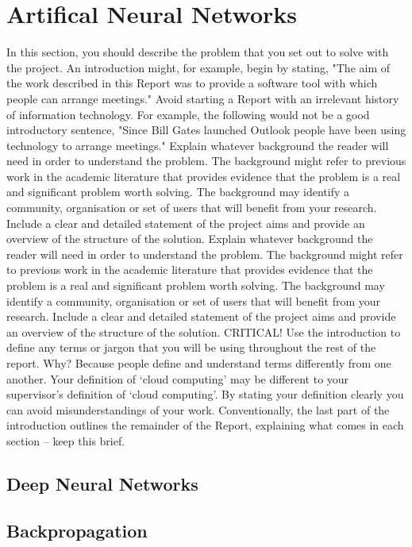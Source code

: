 \section{Artifical Neural Networks}
In this section, you should describe the problem that you set out to solve with the project. An introduction might, for example, begin by stating, "The aim of the work described in this Report was to provide a software tool with which people can arrange meetings." Avoid starting a Report with an irrelevant history of information technology. For example, the following would not be a good introductory sentence, "Since Bill Gates launched Outlook people have been using technology to arrange meetings."
Explain whatever background the reader will need in order to understand the problem. The background might refer to previous work in the academic literature that provides evidence that the problem is a real and significant problem worth solving. The background may identify a community, organisation or set of users that will benefit from your research. Include a clear and detailed statement of the project aims and provide an overview of the structure of the solution.
Explain whatever background the reader will need in order to understand the problem. The background might refer to previous work in the academic literature that provides evidence that the problem is a real and significant problem worth solving. The background may identify a community, organisation or set of users that will benefit from your research. Include a clear and detailed statement of the project aims and provide an overview of the structure of the solution.
CRITICAL! Use the introduction to define any terms or jargon that you will be using throughout the rest of the report.  Why?  Because people define and understand terms differently from one another.  Your definition of ‘cloud computing’ may be different to your supervisor’s definition of ‘cloud computing’.  By stating your definition clearly you can avoid misunderstandings of your work.
Conventionally, the last part of the introduction outlines the remainder of the Report, explaining what comes in each section – keep this brief.

\subsection{Deep Neural Networks}


\subsection{Backpropagation}
